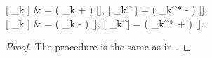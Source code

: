 \begin{theorem}
\label{thm:formalism:mm-wigner:correspondences}
	\begin{eqn*}
		 [ _k  ]
			& = \left( \alpha_k +   \right)
				[],
		\quad
		 [ _k^\dagger {} ]
			= \left( \alpha_k^* -   \right)
				[], \\
		 [  _k ]
			& = \left( \alpha_k -   \right)
				[],
		\quad
		 [  _k^\dagger ]
			= \left( \alpha_k^* +   \right)
				[].
	\end{eqn*}
\end{theorem}
\begin{proof}
The procedure is the same as in .
\end{proof}

